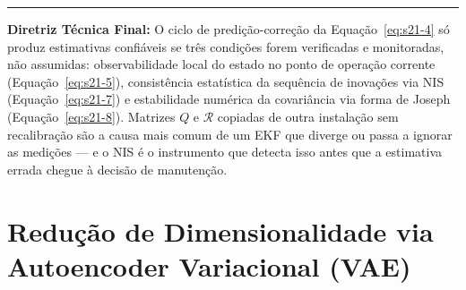 \documentclass[12pt,a4paper]{article}
\numberwithin{equation}{section}
\numberwithin{table}{section}
\numberwithin{figure}{section}
\begin{document}
	\vspace{1em}
	\hrule
	\vspace{1em}

	\textbf{Diretriz Técnica Final:} O ciclo de predição-correção da Equação~\eqref{eq:s21-4} só produz estimativas confiáveis se três condições forem verificadas e monitoradas, não assumidas: observabilidade local do estado no ponto de operação corrente (Equação~\eqref{eq:s21-5}), consistência estatística da sequência de inovações via NIS (Equação~\eqref{eq:s21-7}) e estabilidade numérica da covariância via forma de Joseph (Equação~\eqref{eq:s21-8}). Matrizes $Q$ e $\mathcal{R}$ copiadas de outra instalação sem recalibração são a causa mais comum de um EKF que diverge ou passa a ignorar as medições — e o NIS é o instrumento que detecta isso antes que a estimativa errada chegue à decisão de manutenção.

	\clearpage
	\section{Redução de Dimensionalidade via Autoencoder Variacional (VAE)}

\end{document}
